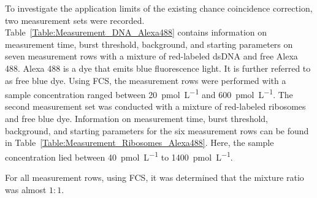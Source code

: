 To investigate the application limits of the existing chance coincidence correction, two measurement sets were recorded. Table~\ref{Table:Measurement_DNA_Alexa488} contains information on measurement time, burst threshold, background, and starting parameters on seven measurement rows with a mixture of red-labeled \gls{dsDNA} and free Alexa 488. Alexa 488 is a dye that emits blue fluorescence light. It is further referred to as free blue dye. Using \gls{FCS}, the measurement rows were performed with a sample concentration ranged between \SI{20}{\pico\mole\per\liter} and \SI{600}{\pico\mole\per\liter}. The second measurement set was conducted with a mixture of red-labeled ribosomes and free blue dye. Information on measurement time, burst threshold, background, and starting parameters for the six measurement rows can be found in Table~\ref{Table:Measurement_Ribosomes_Alexa488}. Here, the sample concentration lied between \SI{40}{\pico\mole\per\liter} to \SI{1400}{\pico\mole\per\liter}. 

For all measurement rows, using \gls{FCS}, it was determined that the mixture ratio was almost $1:1$.

